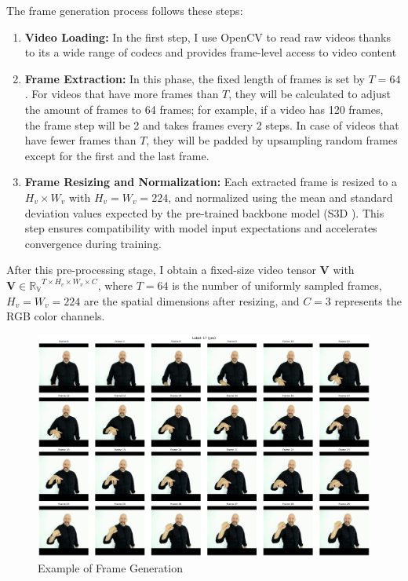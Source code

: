 \documentclass{article}
\begin{document}
\vspace{0.5cm}

\noindent The frame generation process follows these steps:
\begin{enumerate}
  \item \textbf{Video Loading:} In the first step, I use OpenCV to read raw videos thanks to its a wide range of codecs and provides frame-level access to video content
  
  \item \textbf{Frame Extraction:} In this phase, the fixed length of frames is set by $T = 64$. For videos that have more frames than $T$, they will be calculated to adjust the amount of frames to 64 frames; for example, if a video has 120 frames, the frame step will be 2 and takes frames every 2 steps. In case of videos that have fewer frames than $T$, they will be padded by upsampling random frames except for the first and the last frame.
  
  \item \textbf{Frame Resizing and Normalization:} Each extracted frame is resized to a $H_v \times W_v$ with $H_v=W_v=224$, and normalized using the mean and standard deviation values expected by the pre-trained backbone model (S3D \cite{xie2017rethinking}). This step ensures compatibility with model input expectations and accelerates convergence during training.
\end{enumerate}

After this pre-processing stage, I obtain a fixed-size video tensor $\mathbf{V}$ with $\mathbf{V} \in \mathbb{R_V}^{T \times H_v \times W_v \times C}$, where $T = 64$ is the number of uniformly sampled frames, $H_v = W _v= 224$ are the spatial dimensions after resizing, and $C = 3$ represents the RGB color channels. 

\begin{figure}[H]
    \centering
    \includegraphics[width=1\linewidth]{Fig/64-frame.png}
    \caption{Example of Frame Generation}
    \label{fig:frame}
\end{figure}
\end{document}

